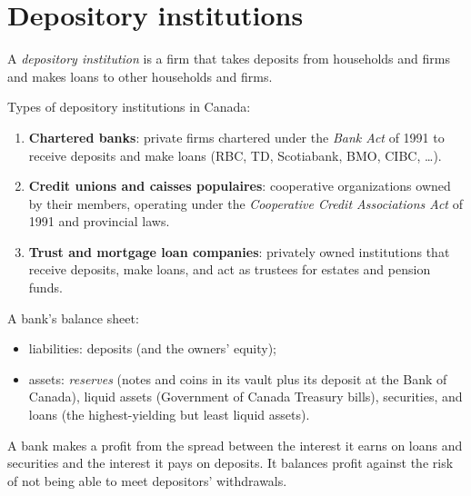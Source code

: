 \section{Depository institutions}

\begin{definition}
A \emph{depository institution} is a firm that takes deposits from households and firms
and makes loans to other households and firms.
\end{definition}

Types of depository institutions in Canada:
\begin{enumerate}
  \item \textbf{Chartered banks}: private firms chartered under the \emph{Bank Act} of
        1991 to receive deposits and make loans (RBC, TD, Scotiabank, BMO, CIBC, \dots).
  \item \textbf{Credit unions and caisses populaires}: cooperative organizations owned by
        their members, operating under the \emph{Cooperative Credit Associations Act} of 1991
        and provincial laws.
  \item \textbf{Trust and mortgage loan companies}: privately owned institutions that
        receive deposits, make loans, and act as trustees for estates and pension funds.
\end{enumerate}

A bank's balance sheet:
\begin{itemize}
  \item liabilities: deposits (and the owners' equity);
  \item assets: \emph{reserves} (notes and coins in its vault plus its deposit at the
        Bank of Canada), liquid assets (Government of Canada Treasury bills), securities,
        and loans (the highest-yielding but least liquid assets).
\end{itemize}
A bank makes a profit from the spread between the interest it earns on loans and
securities and the interest it pays on deposits. It balances profit against the risk of
not being able to meet depositors' withdrawals.

\begin{center}
\end{center}


